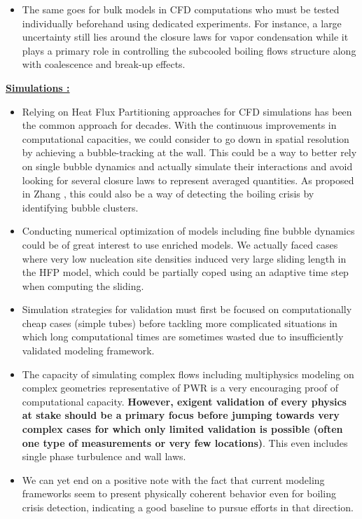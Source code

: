 \begin{itemize}
\item The same goes for bulk models in CFD computations who must be tested individually beforehand using dedicated experiments. For instance, a large uncertainty still lies around the closure laws for vapor condensation while it plays a primary role in controlling the subcooled boiling flows structure along with coalescence and break-up effects.

\end{itemize}

\textbf{\underline{Simulations :}}

\begin{itemize}

\item Relying on Heat Flux Partitioning approaches for CFD simulations has been the common approach for decades. With the continuous improvements in computational capacities, we could consider to go down in spatial resolution by achieving a bubble-tracking at the wall. This could be a way to better rely on single bubble dynamics and actually simulate their interactions \cite{hong_investigation_2022} and avoid looking for several closure laws to represent averaged quantities. As proposed in Zhang \etal \cite{zhang_percolative_2019}, this could also be a way of detecting the boiling crisis by identifying bubble clusters.

\item Conducting numerical optimization of models including fine bubble dynamics could be of great interest to use enriched models. We actually faced cases where very low nucleation site densities induced very large sliding length in the HFP model, which could be partially coped using an adaptive time step when computing the sliding.

\item Simulation strategies for validation must first be focused on computationally cheap cases (\eg simple tubes) before tackling more complicated situations in which long computational times are sometimes wasted due to insufficiently validated modeling framework.

\item The capacity of simulating complex flows including multiphysics modeling on complex geometries representative of PWR is a very encouraging proof of computational capacity. \textbf{However, exigent validation of every physics at stake should be a primary focus before jumping towards very complex cases for which only limited validation is possible (often one type of measurements or very few locations)}. This even includes single phase turbulence and wall laws.

\item We can yet end on a positive note with the fact that current modeling frameworks seem to present physically coherent behavior even for boiling crisis detection, indicating a good baseline to pursue efforts in that direction.



\end{itemize}